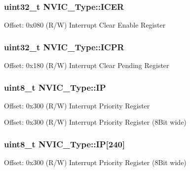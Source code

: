 \subsubsection[{\texorpdfstring{I\+C\+ER}{ICER}}]{ uint32\+\_\+t N\+V\+I\+C\+\_\+\+Type\+::\+I\+C\+ER}\hypertarget{struct_n_v_i_c___type_a856fba9cb1acc608fc03d8f2451bb16a}{}\label{struct_n_v_i_c___type_a856fba9cb1acc608fc03d8f2451bb16a}
Offset\+: 0x080 (R/W) Interrupt Clear Enable Register 
\subsubsection[{\texorpdfstring{I\+C\+PR}{ICPR}}]{ uint32\+\_\+t N\+V\+I\+C\+\_\+\+Type\+::\+I\+C\+PR}\hypertarget{struct_n_v_i_c___type_a7483899bfdf859f059384dd9aacd0072}{}\label{struct_n_v_i_c___type_a7483899bfdf859f059384dd9aacd0072}
Offset\+: 0x180 (R/W) Interrupt Clear Pending Register 
\subsubsection[{\texorpdfstring{IP}{IP}}]{ uint8\+\_\+t N\+V\+I\+C\+\_\+\+Type\+::\+IP}\hypertarget{struct_n_v_i_c___type_aa7d4c60e9bbf4b3d07a6b3ba39a7d7d9}{}\label{struct_n_v_i_c___type_aa7d4c60e9bbf4b3d07a6b3ba39a7d7d9}
Offset\+: 0x300 (R/W) Interrupt Priority Register

Offset\+: 0x300 (R/W) Interrupt Priority Register (8\+Bit wide) 
\subsubsection[{\texorpdfstring{IP}{IP}}]{ uint8\+\_\+t N\+V\+I\+C\+\_\+\+Type\+::\+IP\mbox{[}240\mbox{]}}\hypertarget{struct_n_v_i_c___type_a6524789fedb94623822c3e0a47f3d06c}{}\label{struct_n_v_i_c___type_a6524789fedb94623822c3e0a47f3d06c}
Offset\+: 0x300 (R/W) Interrupt Priority Register (8\+Bit wide) 
